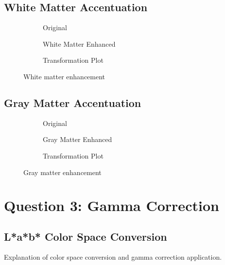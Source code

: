 \documentclass[12pt]{article}
\begin{document}
\subsection{White Matter Accentuation}
\begin{figure}[H]
    \centering
    \begin{subfigure}{0.3\textwidth}
        \fbox{\rule{0pt}{1.5in}\rule{1.5in}{0pt}}
        \caption{Original}
    \end{subfigure}
    \hfill
    \begin{subfigure}{0.3\textwidth}
        \fbox{\rule{0pt}{1.5in}\rule{1.5in}{0pt}}
        \caption{White Matter Enhanced}
    \end{subfigure}
    \hfill
    \begin{subfigure}{0.3\textwidth}
        \fbox{\rule{0pt}{1.5in}\rule{1.5in}{0pt}}
        \caption{Transformation Plot}
    \end{subfigure}
    \caption{White matter enhancement}
\end{figure}

\subsection{Gray Matter Accentuation}
\begin{figure}[H]
    \centering
    \begin{subfigure}{0.3\textwidth}
        \fbox{\rule{0pt}{1.5in}\rule{1.5in}{0pt}}
        \caption{Original}
    \end{subfigure}
    \hfill
    \begin{subfigure}{0.3\textwidth}
        \fbox{\rule{0pt}{1.5in}\rule{1.5in}{0pt}}
        \caption{Gray Matter Enhanced}
    \end{subfigure}
    \hfill
    \begin{subfigure}{0.3\textwidth}
        \fbox{\rule{0pt}{1.5in}\rule{1.5in}{0pt}}
        \caption{Transformation Plot}
    \end{subfigure}
    \caption{Gray matter enhancement}
\end{figure}

\section{Question 3: Gamma Correction}
\subsection{L*a*b* Color Space Conversion}
Explanation of color space conversion and gamma correction application.
\end{document}
